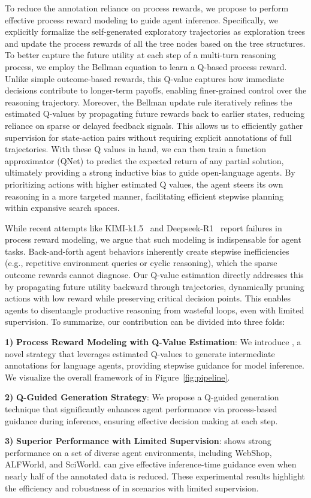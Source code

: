 To reduce the annotation reliance on process rewards, we propose {\ours} to perform effective process reward modeling to guide agent inference. Specifically, we explicitly formalize the self-generated exploratory trajectories as exploration trees and update the process rewards of all the tree nodes based on the tree structures. To better capture the future utility at each step of a multi-turn reasoning process, we employ the Bellman equation \citep{bellman2015applied} to learn a Q-based process reward. Unlike simple outcome-based rewards, this Q-value captures how immediate decisions contribute to longer-term payoffs, enabling finer-grained control over the reasoning trajectory. Moreover, the Bellman update rule iteratively refines the estimated Q-values by propagating future rewards back to earlier states, reducing reliance on sparse or delayed feedback signals. This allows us to efficiently gather supervision for state-action pairs without requiring explicit annotations of full trajectories. With these Q values in hand, we can then train a function approximator (QNet) \citep{qlearning} to predict the expected return of any partial solution, ultimately providing a strong inductive bias to guide open-language agents. By prioritizing actions with higher estimated Q values, the agent steers its own reasoning in a more targeted manner, facilitating efficient stepwise planning within expansive search spaces.


While recent attempts like KIMI-k1.5~\citep{team2025kimi} and Deepseek-R1~\citep{guo2025deepseek} report failures in process reward modeling, we argue that such modeling is indispensable for agent tasks. Back-and-forth agent behaviors inherently create stepwise inefficiencies (e.g., repetitive environment queries or cyclic reasoning), which the sparse outcome rewards cannot diagnose. Our Q-value estimation directly addresses this by propagating future utility backward through trajectories, dynamically pruning actions with low reward while preserving critical decision points. This enables agents to disentangle productive reasoning from wasteful loops, even with limited supervision. To summarize, our contribution can be divided into three folds:

    \textbf{1)} \textbf{Process Reward Modeling with Q-Value Estimation}: We introduce {\ours}, a novel strategy that leverages estimated Q-values to generate intermediate annotations for language agents, providing stepwise guidance for model inference. We visualize the overall framework of {\ours} in Figure~\ref{fig:pipeline}.    
    
     \textbf{2)} \textbf{Q-Guided Generation Strategy}: We propose a Q-guided generation technique that significantly enhances agent performance via process-based guidance during inference, ensuring effective decision making at each step.    
     
    \textbf{3)} \textbf{Superior Performance with Limited Supervision}: {\ours} shows strong performance on a set of diverse agent environments, including WebShop, ALFWorld, and SciWorld. {\ours} can give effective inference-time guidance even when nearly half of the annotated data is reduced. These experimental results highlight the efficiency and robustness of {\ours} in scenarios with limited supervision.
    
